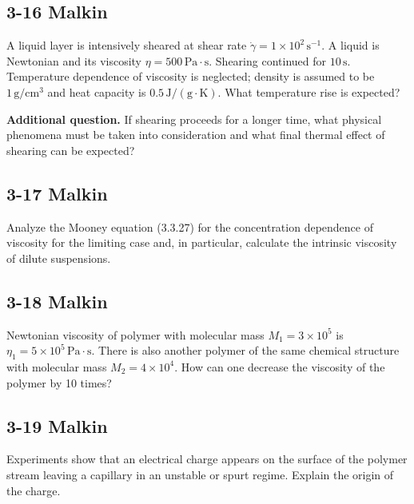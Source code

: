 \subsection{3-16 Malkin}
A liquid layer is intensively sheared at shear rate $\dot{\gamma}=1\times10^2\,\mathrm{s}^{-1}$. A liquid is Newtonian and its viscosity $\eta=500\,\mathrm{Pa\cdot s}$. Shearing continued for $10\,\mathrm{s}$. Temperature dependence of viscosity is neglected; density is assumed to be $1\,\mathrm{g/cm^3}$ and heat capacity is $0.5\,\mathrm{J/(g\cdot K)}$. What temperature rise is expected?

\textbf{Additional question.} If shearing proceeds for a longer time, what physical phenomena must be taken into consideration and what final thermal effect of shearing can be expected?

\subsection{3-17 Malkin}
Analyze the Mooney equation (3.3.27) for the concentration dependence of viscosity for the limiting case and, in particular, calculate the intrinsic viscosity of dilute suspensions.

\subsection{3-18 Malkin}
Newtonian viscosity of polymer with molecular mass $M_1=3\times10^5$ is $\eta_1=5\times10^5\,\mathrm{Pa\cdot s}$. There is also another polymer of the same chemical structure with molecular mass $M_2=4\times10^4$. How can one decrease the viscosity of the polymer by 10 times?

\subsection{3-19 Malkin}
Experiments show that an electrical charge appears on the surface of the polymer stream leaving a capillary in an unstable or spurt regime. Explain the origin of the charge.

